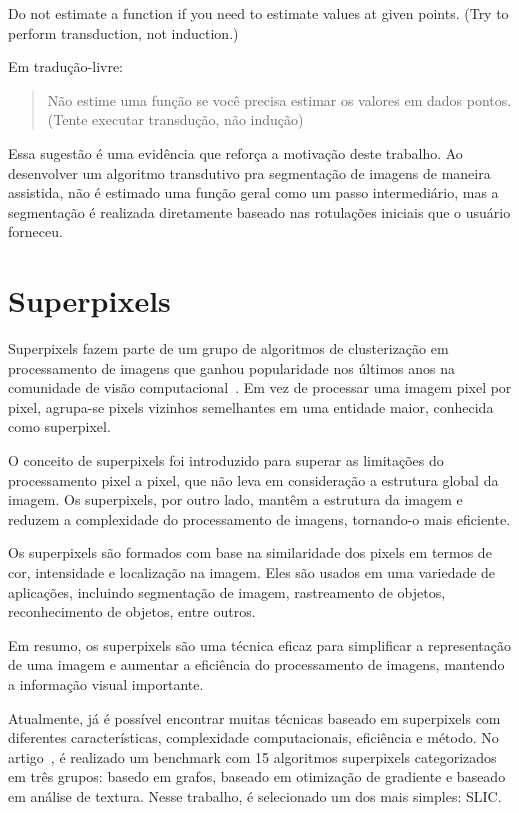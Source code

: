 \begin{displayquote}

  Do not estimate a function if you need to estimate values at given
  points. (Try to perform transduction, not induction.)

\end{displayquote}

Em tradução-livre: \blockquote{Não estime uma função se você precisa estimar
os valores em dados pontos. (Tente executar transdução, não
indução)}. Essa sugestão é uma evidência que reforça a motivação
deste trabalho. Ao desenvolver um algoritmo transdutivo pra
segmentação de imagens de maneira assistida, não é estimado uma função
geral como um passo intermediário, mas a segmentação é realizada
diretamente baseado nas rotulações iniciais que o usuário forneceu.


\section{Superpixels}\label{sec:teorica-superpixel}

Superpixels fazem parte de um grupo de algoritmos de clusterização em
processamento de imagens que ganhou popularidade nos últimos anos na
comunidade de visão computacional~\cite{SuperpixelSurvey2020}. Em vez
de processar uma imagem pixel por pixel, agrupa-se pixels vizinhos
semelhantes em uma entidade maior, conhecida como superpixel.

O conceito de superpixels foi introduzido para superar as limitações
do processamento pixel a pixel, que não leva em consideração a
estrutura global da imagem. Os superpixels, por outro lado, mantêm a
estrutura da imagem e reduzem a complexidade do processamento de
imagens, tornando-o mais eficiente.

Os superpixels são formados com base na similaridade dos pixels em
termos de cor, intensidade e localização na imagem. Eles são usados em
uma variedade de aplicações, incluindo segmentação de imagem,
rastreamento de objetos, reconhecimento de objetos, entre outros.

Em resumo, os superpixels são uma técnica eficaz para simplificar a
representação de uma imagem e aumentar a eficiência do processamento
de imagens, mantendo a informação visual importante.

Atualmente, já é possível encontrar muitas técnicas baseado em
superpixels com diferentes características, complexidade
computacionais, eficiência e método. No
artigo~\cite{SuperPixelBenchmark2017}, é realizado um benchmark com 15
algoritmos superpixels categorizados em três grupos: basedo em grafos,
baseado em otimização de gradiente e baseado em análise de
textura. Nesse trabalho, é selecionado um dos mais simples: \gls{SLIC}.

